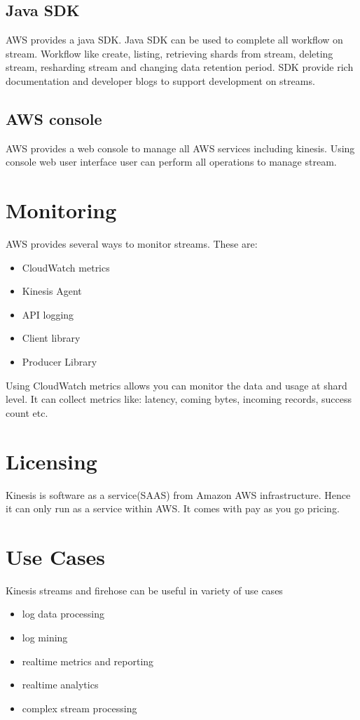 \documentclass[9pt,twocolumn,twoside]{styles/osajnl}
\begin{document}
\subsection{Java SDK}
AWS provides a java SDK. Java SDK \cite{www-kinesis-javasdk} can be used to complete all workflow on stream. Workflow like create, listing, retrieving shards from stream, deleting stream, resharding stream and changing data retention period. SDK provide rich documentation and developer blogs to support development on streams.

\subsection{AWS console}
AWS provides a web console to manage all AWS services including kinesis.  Using console web user interface user can perform all operations to manage stream.

\section{Monitoring}
AWS provides several ways to monitor streams. These are:
\begin{itemize}
	\item  CloudWatch metrics
	\item Kinesis Agent 
	\item API logging
	\item Client library
	\item Producer Library 
\end{itemize}

Using CloudWatch metrics allows you can monitor the data and usage at shard level.  It can collect metrics like: latency, coming bytes, incoming records, success count etc.

\section{Licensing}
Kinesis is software as a service(SAAS) from Amazon AWS infrastructure. Hence it can only run as a service within AWS. It comes with pay as you go pricing.

\section{Use Cases}

Kinesis streams and firehose can be useful in variety of use cases \cite{www-kinesis} 
\begin{itemize}
	\item  log data processing
	\item log mining
	\item realtime metrics and reporting
	\item realtime analytics
	\item complex stream processing
\end{itemize}
\end{document}
